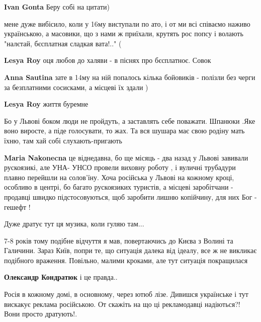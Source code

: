\begin{itemize}
\begin{itemize}
\textbf{Ivan Gonta}
Беру собі на цитати)
\end{itemize} %


мене дуже вибісило, коли у 16му виступали по ато, і от ми всі співаємо наживо
українською, а масовики, що з нами ж приїхали, крутять рос попсу і волають
"налєтай, бєсплатная сладкая вата!.." (

\begin{itemize} %
\textbf{Lesya Roy} оця любов до халяви - в піснях про бєсплатноє. Совок

\textbf{Anna Sautina} зате в 14му на ній попалось кілька бойовиків - полізли без черги за безплатними сосисками, а місцеві їх здали )

\textbf{Lesya Roy} життя буремне
\end{itemize} %


Бо у Львові боком люди не пройдуть, а заставлять себе поважати. Шпанюки .Яке воно
виросте, а піде голосувати, то жах.  Та вся шушара має свою родіну мать їхню, там
хай собі слухають-пригають

\begin{itemize} %
\textbf{Maria Nakonecna} це віднедавна, бо ще місяць - два назад у Львові завивали рускоязикі, але
УНА- УНСО провели виховну роботу , і вуличні трубадури плавно перейшли на солов'їну.
Хоча російська у Львові на кожному кроці, особливо в центрі, бо багато рускоязиких туристів, а місцеві заробітчани - продавці швидко підстосовуються, щоб заробити лишню копійчину, для них Бог - гешефт !
\end{itemize} %

Дуже дратує тут ця музика, коли гуляю там...


7-8 років тому подібне відчуття я мав, повертаючись до Києва з Волині та
Галичини. Зараз Київ, попри те, що ситуація далека від ідеалу, все ж не
викликає подібного враження. Повільно, малими кроками, але тут ситуація
покращилася

\begin{itemize} %
\textbf{Олександр Кондратюк} і це правда..
\end{itemize} %


Росія в кожному домі, в основному, через ютюб лізе. Дивишся українське і тут
вискакує реклама російською. От скажіть на що ці рекламодавці надіються?! Вони
просто дратують!.


\end{itemize}
